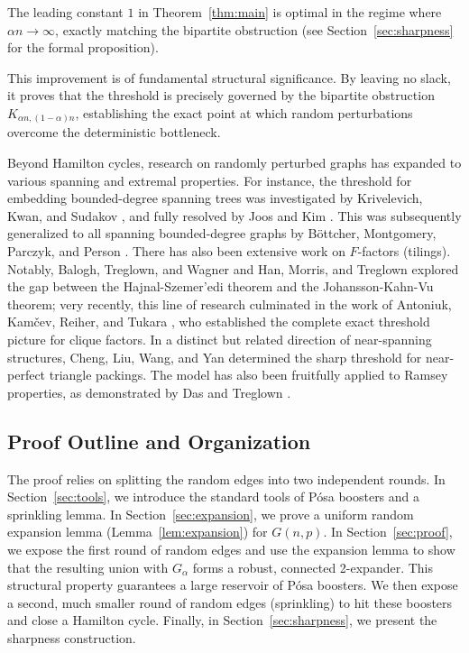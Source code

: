 \documentclass[11pt,reqno]{amsart}
\theoremstyle{definition}
\theoremstyle{remark}
\renewcommand\to{\rightarrow}
\begin{document}
The leading constant $1$ in Theorem~\ref{thm:main} is optimal in the regime where $\alpha n \to \infty$, exactly matching the bipartite obstruction (see Section~\ref{sec:sharpness} for the formal proposition). 

This improvement is of fundamental structural significance. By leaving no slack, it proves that the threshold is precisely governed by the bipartite obstruction $K_{\alpha n, (1-\alpha)n}$, establishing the exact point at which random perturbations overcome the deterministic bottleneck.

Beyond Hamilton cycles, research on randomly perturbed graphs has expanded to various spanning and extremal properties. For instance, the threshold for embedding bounded-degree spanning trees was investigated by Krivelevich, Kwan, and Sudakov \cite{KKS}, and fully resolved by Joos and Kim \cite{JK}. This was subsequently generalized to all spanning bounded-degree graphs by B\"ottcher, Montgomery, Parczyk, and Person \cite{BMPP}. There has also been extensive work on $F$-factors (tilings). Notably, Balogh, Treglown, and Wagner \cite{BTW} and Han, Morris, and Treglown \cite{HMT} explored the gap between the Hajnal-Szemer'edi theorem and the Johansson-Kahn-Vu theorem; very recently, this line of research culminated in the work of Antoniuk, Kam\v{c}ev, Reiher, and Tukara \cite{AKRT}, who established the complete exact threshold picture for clique factors. In a distinct but related direction of near-spanning structures, Cheng, Liu, Wang, and Yan \cite{CLWY} determined the sharp threshold for near-perfect triangle packings. The model has also been fruitfully applied to Ramsey properties, as demonstrated by Das and Treglown \cite{DT}.

\subsection*{Proof Outline and Organization}
The proof relies on splitting the random edges into two independent rounds. In Section~\ref{sec:tools}, we introduce the standard tools of P\'osa boosters and a sprinkling lemma. In Section~\ref{sec:expansion}, we prove a uniform random expansion lemma (Lemma~\ref{lem:expansion}) for $G(n,p)$. In Section~\ref{sec:proof}, we expose the first round of random edges and use the expansion lemma to show that the resulting union with $G_\alpha$ forms a robust, connected 2-expander. This structural property guarantees a large reservoir of P\'osa boosters. We then expose a second, much smaller round of random edges (sprinkling) to hit these boosters and close a Hamilton cycle. Finally, in Section~\ref{sec:sharpness}, we present the sharpness construction.
\end{document}
